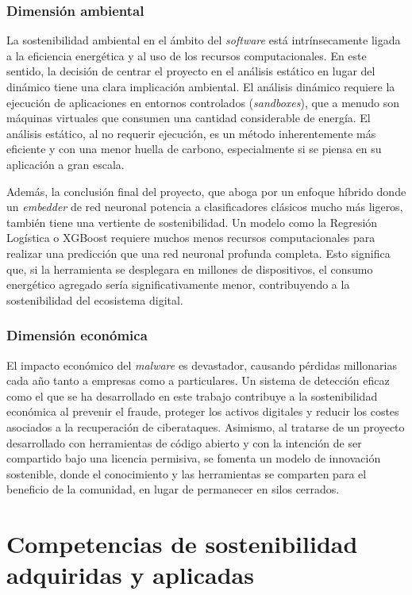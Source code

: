 \subsubsection{Dimensión ambiental}
La sostenibilidad ambiental en el ámbito del \textit{software} está intrínsecamente ligada a la eficiencia energética y al uso de los recursos computacionales. En este sentido, la decisión de centrar el proyecto en el análisis estático en lugar del dinámico tiene una clara implicación ambiental. El análisis dinámico requiere la ejecución de aplicaciones en entornos controlados (\textit{sandboxes}), que a menudo son máquinas virtuales que consumen una cantidad considerable de energía. El análisis estático, al no requerir ejecución, es un método inherentemente más eficiente y con una menor huella de carbono, especialmente si se piensa en su aplicación a gran escala.

Además, la conclusión final del proyecto, que aboga por un enfoque híbrido donde un \textit{embedder} de red neuronal potencia a clasificadores clásicos mucho más ligeros, también tiene una vertiente de sostenibilidad. Un modelo como la Regresión Logística o XGBoost requiere muchos menos recursos computacionales para realizar una predicción que una red neuronal profunda completa. Esto significa que, si la herramienta se desplegara en millones de dispositivos, el consumo energético agregado sería significativamente menor, contribuyendo a la sostenibilidad del ecosistema digital.

\subsubsection{Dimensión económica}
El impacto económico del \textit{malware} es devastador, causando pérdidas millonarias cada año tanto a empresas como a particulares. Un sistema de detección eficaz como el que se ha desarrollado en este trabajo contribuye a la sostenibilidad económica al prevenir el fraude, proteger los activos digitales y reducir los costes asociados a la recuperación de ciberataques. Asimismo, al tratarse de un proyecto desarrollado con herramientas de código abierto y con la intención de ser compartido bajo una licencia permisiva, se fomenta un modelo de innovación sostenible, donde el conocimiento y las herramientas se comparten para el beneficio de la comunidad, en lugar de permanecer en silos cerrados.

\section{Competencias de sostenibilidad adquiridas y aplicadas}

